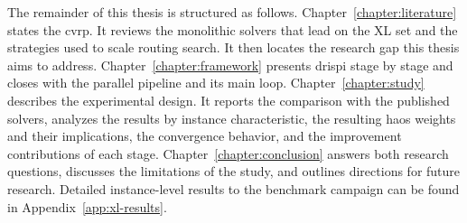 The remainder of this thesis is structured as follows.
Chapter~\ref{chapter:literature} states the \gls{cvrp}. It reviews the monolithic solvers that lead on the XL set and the strategies used to scale routing search. It then locates the research gap this thesis aims to address.
Chapter~\ref{chapter:framework} presents \gls{drispi} stage by stage and closes with the parallel pipeline and its main loop.
Chapter~\ref{chapter:study} describes the experimental design. It reports the comparison with the published solvers, analyzes the results by instance characteristic, the resulting \gls{haos} weights and their implications, the convergence behavior, and the improvement contributions of each stage.
Chapter~\ref{chapter:conclusion} answers both research questions, discusses the limitations of the study, and outlines directions for future research. Detailed instance-level results to the benchmark campaign can be found in Appendix~\ref{app:xl-results}.
